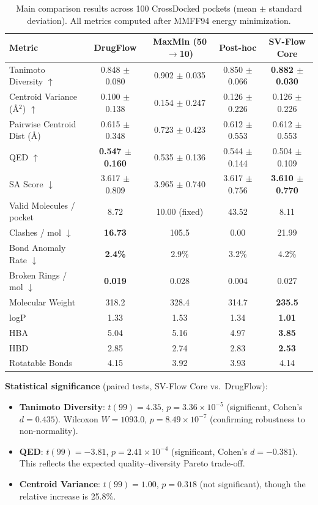 \documentclass[a4paper,11pt]{article}
\begin{document}
\begin{table}[H]
\centering
\caption{Main comparison results across 100 CrossDocked pockets
         (mean $\pm$ standard deviation).  All metrics computed after MMFF94
         energy minimization.}
\label{tab:main_results}
\small
\begin{tabular}{l c c c c}
\toprule
\textbf{Metric} & \textbf{DrugFlow} & \textbf{MaxMin (50$\to$10)} & \textbf{Post-hoc} & \textbf{SV-Flow Core} \\
\midrule
Tanimoto Diversity $\uparrow$
  & 0.848 $\pm$ 0.080 & 0.902 $\pm$ 0.035 & 0.850 $\pm$ 0.066 & \textbf{0.882 $\pm$ 0.030} \\
Centroid Variance (\AA$^2$) $\uparrow$
  & 0.100 $\pm$ 0.138 & 0.154 $\pm$ 0.247 & 0.126 $\pm$ 0.226 & 0.126 $\pm$ 0.226 \\
Pairwise Centroid Dist (\AA)
  & 0.615 $\pm$ 0.348 & 0.723 $\pm$ 0.423 & 0.612 $\pm$ 0.553 & 0.612 $\pm$ 0.553 \\
QED $\uparrow$
  & \textbf{0.547 $\pm$ 0.160} & 0.535 $\pm$ 0.136 & 0.544 $\pm$ 0.144 & 0.504 $\pm$ 0.109 \\
SA Score $\downarrow$
  & 3.617 $\pm$ 0.809 & 3.965 $\pm$ 0.740 & 3.617 $\pm$ 0.756 & \textbf{3.610 $\pm$ 0.770} \\
Valid Molecules / pocket
  & 8.72 & 10.00 (fixed) & 43.52 & 8.11 \\
Clashes / mol $\downarrow$
  & \textbf{16.73} & 105.5 & 0.00 & 21.99 \\
Bond Anomaly Rate $\downarrow$
  & \textbf{2.4\%} & 2.9\% & 3.2\% & 4.2\% \\
Broken Rings / mol $\downarrow$
  & \textbf{0.019} & 0.028 & 0.004 & 0.027 \\
Molecular Weight
  & 318.2 & 328.4 & 314.7 & \textbf{235.5} \\
logP
  & 1.33 & 1.53 & 1.34 & \textbf{1.01} \\
HBA
  & 5.04 & 5.16 & 4.97 & \textbf{3.85} \\
HBD
  & 2.85 & 2.74 & 2.83 & \textbf{2.53} \\
Rotatable Bonds
  & 4.15 & 3.92 & 3.93 & 4.14 \\
\bottomrule
\end{tabular}
\end{table}

\textbf{Statistical significance} (paired tests, SV-Flow Core vs.\ DrugFlow):

\begin{itemize}
  \item \textbf{Tanimoto Diversity}: $t(99) = 4.35$, $p = 3.36 \times 10^{-5}$
    (significant, Cohen's $d = 0.435$).  Wilcoxon $W = 1093.0$, $p = 8.49
    \times 10^{-7}$ (confirming robustness to non-normality).
  \item \textbf{QED}: $t(99) = -3.81$, $p = 2.41 \times 10^{-4}$ (significant,
    Cohen's $d = -0.381$).  This reflects the expected quality--diversity
    Pareto trade-off.
  \item \textbf{Centroid Variance}: $t(99) = 1.00$, $p = 0.318$ (not
    significant), though the relative increase is 25.8\%.
\end{itemize}
\end{document}
